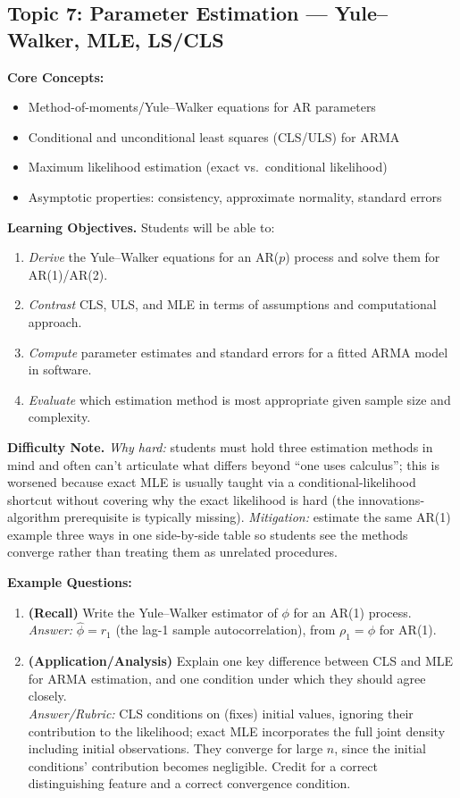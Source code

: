 \documentclass[11pt]{article}
\begin{document}
\subsection{Topic 7: Parameter Estimation --- Yule--Walker, MLE, LS/CLS}

\textbf{Core Concepts:}
\begin{itemize}
\item Method-of-moments/Yule--Walker equations for AR parameters
\item Conditional and unconditional least squares (CLS/ULS) for ARMA
\item Maximum likelihood estimation (exact vs.\ conditional likelihood)
\item Asymptotic properties: consistency, approximate normality, standard errors
\end{itemize}

\textbf{Learning Objectives.} Students will be able to:
\begin{enumerate}
\item \emph{Derive} the Yule--Walker equations for an AR($p$) process and solve them for AR(1)/AR(2).
\item \emph{Contrast} CLS, ULS, and MLE in terms of assumptions and computational approach.
\item \emph{Compute} parameter estimates and standard errors for a fitted ARMA model in software.
\item \emph{Evaluate} which estimation method is most appropriate given sample size and complexity.
\end{enumerate}

\textbf{Difficulty Note.} \emph{Why hard:} students must hold three estimation methods in mind and often can't articulate what differs beyond ``one uses calculus''; this is worsened because exact MLE is usually taught via a conditional-likelihood shortcut without covering why the exact likelihood is hard (the innovations-algorithm prerequisite is typically missing). \emph{Mitigation:} estimate the same AR(1) example three ways in one side-by-side table so students see the methods converge rather than treating them as unrelated procedures.

\textbf{Example Questions:}
\begin{enumerate}
\item \textbf{(Recall)} Write the Yule--Walker estimator of $\phi$ for an AR(1) process. \\
\emph{Answer:} $\hat\phi = r_1$ (the lag-1 sample autocorrelation), from $\rho_1=\phi$ for AR(1).
\item \textbf{(Application/Analysis)} Explain one key difference between CLS and MLE for ARMA estimation, and one condition under which they should agree closely. \\
\emph{Answer/Rubric:} CLS conditions on (fixes) initial values, ignoring their contribution to the likelihood; exact MLE incorporates the full joint density including initial observations. They converge for large $n$, since the initial conditions' contribution becomes negligible. Credit for a correct distinguishing feature and a correct convergence condition.
\end{enumerate}
\end{document}
